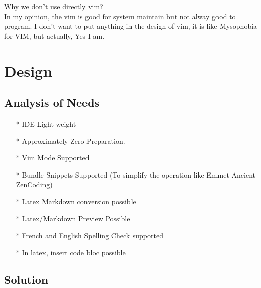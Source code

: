 \documentclass[12pt,a4paper]{article}
\begin{document}
Why we don't use directly vim? \\

In my opinion, the vim is good for system maintain but not alway good to program. I don't want to put anything in the design of vim, it is like Mysophobia for VIM, but actually, Yes I am.\\


\section{Design}

\subsection{Analysis of Needs}

\begin{itemize}
	\item [*] IDE Light weight
	\item [*] Approximately Zero Preparation.
	\item [*] Vim Mode Supported
	\item [*] Bundle Snippets Supported (To simplify the operation like Emmet-Ancient ZenCoding)
	\item [*] Latex Markdown conversion possible
	\item [*] Latex/Markdown Preview Possible
	\item [*] French and English Spelling Check supported
	\item [*] In latex, insert code bloc possible
\end{itemize}


\subsection{Solution}
\end{document}
